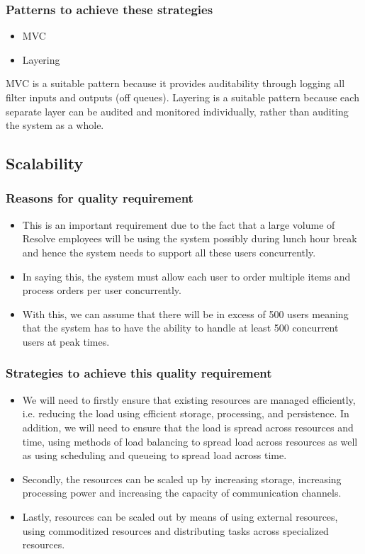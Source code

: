 \documentclass[12pt]{article}
\begin{document}
 \subsubsection{Patterns to achieve these strategies}
 \begin{itemize}
 \item MVC
 \item Layering
\end{itemize} 
 MVC is a suitable pattern because it provides auditability through logging all filter inputs and outputs (off queues). Layering is a suitable pattern because each separate layer can be audited and monitored individually, rather than auditing the system as a whole.
  
\subsection{Scalability}
	\subsubsection{Reasons for quality requirement}
	\begin{itemize}
	\item This is an important requirement due to the fact that a large volume of Resolve employees will be using the system possibly during lunch hour break and hence the system needs to support all these users concurrently. 
	\item In saying this, the system must allow each user to order multiple items and process orders per user concurrently.
	\item With this, we can assume that there will be in excess of 500 users meaning that the system has to have the ability to handle at least 500 concurrent users at peak times.
	\end{itemize}
	\subsubsection{Strategies to achieve this quality requirement}
	\begin{itemize}
		\item We will need to firstly ensure that existing resources are managed efficiently, i.e. reducing the load using efficient storage, processing,  and persistence. In addition, we will need to ensure that the load is spread across resources and time, using methods of load balancing to spread load across resources as well as using scheduling and queueing to spread load across time.
		\item Secondly, the resources can be scaled up by increasing storage, increasing processing power and increasing the capacity of communication channels.
		\item Lastly, resources can be scaled out by means of using external resources, using commoditized resources and distributing tasks across specialized resources.
		\end{itemize}
\end{document}
